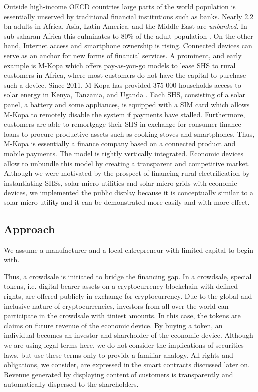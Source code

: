 Outside high-income \ac{OECD} countries large parts of the world population is essentially unserved by traditional financial institutions such as banks. Nearly 2.2 bn adults in Africa, Asia, Latin America, and the Middle East are \emph{unbanked}. In sub-saharan Africa this culminates to 80\% of the adult population \parencite{chaia2010counting}. On the other hand, Internet access and smartphone ownership is rising. Connected devices can serve as an anchor for new forms of financial services. A prominent, and early example is M-Kopa which offers pay-as-you-go models to lease \ac{SHS} to rural customers in Africa, where most customers do not have the capital to purchase such a device. Since 2011, M-Kopa has provided 375 000 households access to solar energy in Kenya, Tanzania, and Uganda \parencite{adabou2016}. Each \ac{SHS}, consisting of a solar panel, a battery and some appliances, is equipped with a SIM card which allows M-Kopa to remotely disable the system if payments have stalled. Furthermore, customers are able to remortgage their \ac{SHS} in exchange for consumer finance loans to procure productive assets such as cooking stoves and smartphones. Thus, M-Kopa is essentially a finance company based on a connected product and mobile payments. The model is tightly vertically integrated. Economic devices allow to unbundle this model by creating a transparent and competitive market. Although we were motivated by the prospect of financing rural electrification by instantiating \ac{SHS}s, solar micro utilities and solar micro grids with economic devices, we implemented the public display because it is conceptually similar to a solar micro utility and it can be demonstrated more easily and with more effect.


\subsection{Approach}

We assume a manufacturer and a local entrepreneur with limited capital to begin with. 


Thus, a crowdsale is initiated to bridge the financing gap. In a crowdsale, special tokens, i.e. digital bearer assets on a cryptocurrency blockchain with defined rights, are offered publicly in exchange for cryptocurrency. Due to the global and inclusive nature of cryptocurrencies, investors from all over the world can participate in the crowdsale with tiniest amounts. In this case, the tokens are claims on future revenue of the economic device. By buying a token, an individual becomes an investor and shareholder of the economic device. Although we are using legal terms here, we do not consider the implications of securities laws, but use these terms only to provide a familiar analogy. All rights and obligations, we consider, are expressed in the smart contracts discussed later on. Revenue generated by displaying content of customers is transparently and automatically dispersed to the shareholders. 

